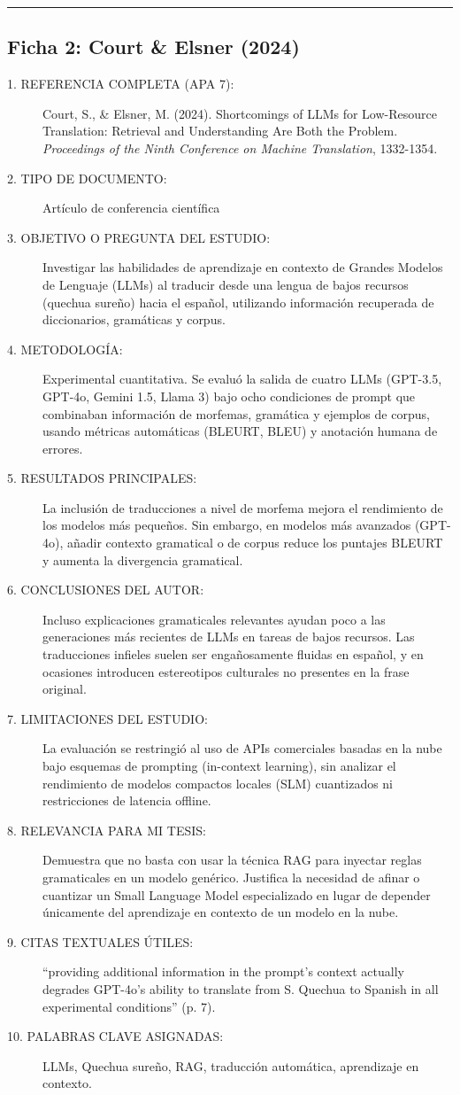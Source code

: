\vspace{0.5cm}
\hrule
\vspace{0.5cm}

\subsection*{Ficha 2: Court \& Elsner (2024)}
\begin{description}
	\item[1. REFERENCIA COMPLETA (APA 7):] Court, S., \& Elsner, M. (2024). Shortcomings of LLMs for Low-Resource Translation: Retrieval and Understanding Are Both the Problem. \textit{Proceedings of the Ninth Conference on Machine Translation}, 1332-1354.
	\item[2. TIPO DE DOCUMENTO:] Artículo de conferencia científica
	\item[3. OBJETIVO O PREGUNTA DEL ESTUDIO:] Investigar las habilidades de aprendizaje en contexto de Grandes Modelos de Lenguaje (LLMs) al traducir desde una lengua de bajos recursos (quechua sureño) hacia el español, utilizando información recuperada de diccionarios, gramáticas y corpus.
	\item[4. METODOLOGÍA:] Experimental cuantitativa. Se evaluó la salida de cuatro LLMs (GPT-3.5, GPT-4o, Gemini 1.5, Llama 3) bajo ocho condiciones de prompt que combinaban información de morfemas, gramática y ejemplos de corpus, usando métricas automáticas (BLEURT, BLEU) y anotación humana de errores.
	\item[5. RESULTADOS PRINCIPALES:] La inclusión de traducciones a nivel de morfema mejora el rendimiento de los modelos más pequeños. Sin embargo, en modelos más avanzados (GPT-4o), añadir contexto gramatical o de corpus reduce los puntajes BLEURT y aumenta la divergencia gramatical.
	\item[6. CONCLUSIONES DEL AUTOR:] Incluso explicaciones gramaticales relevantes ayudan poco a las generaciones más recientes de LLMs en tareas de bajos recursos. Las traducciones infieles suelen ser engañosamente fluidas en español, y en ocasiones introducen estereotipos culturales no presentes en la frase original.
	\item[7. LIMITACIONES DEL ESTUDIO:] La evaluación se restringió al uso de APIs comerciales basadas en la nube bajo esquemas de prompting (in-context learning), sin analizar el rendimiento de modelos compactos locales (SLM) cuantizados ni restricciones de latencia offline.
	\item[8. RELEVANCIA PARA MI TESIS:] Demuestra que no basta con usar la técnica RAG para inyectar reglas gramaticales en un modelo genérico. Justifica la necesidad de afinar o cuantizar un Small Language Model especializado en lugar de depender únicamente del aprendizaje en contexto de un modelo en la nube.
	\item[9. CITAS TEXTUALES ÚTILES:] ``providing additional information in the prompt’s context actually degrades GPT-4o’s ability to translate from S. Quechua to Spanish in all experimental conditions'' (p. 7).
	\item[10. PALABRAS CLAVE ASIGNADAS:] LLMs, Quechua sureño, RAG, traducción automática, aprendizaje en contexto.
\end{description}

